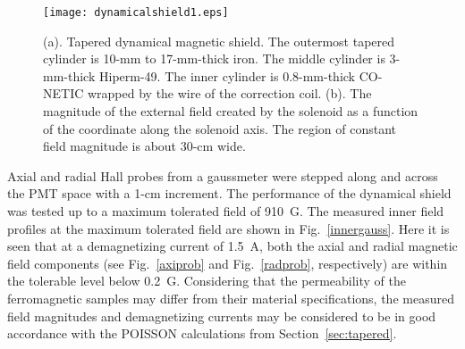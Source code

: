 \documentclass[12pt]{article}
\begin{document}
\begin{figure}[htbp]
\centering
\subfloat[]
{\texttt{[image: dynamicalshield1.eps]}
\label{DMSPHOTO}}
\qquad
{}
\caption{(a). Tapered dynamical magnetic shield. The outermost tapered cylinder is 
10-mm to 17-mm-thick iron. The middle cylinder is 3-mm-thick Hiperm-49. The inner 
cylinder is 0.8-mm-thick CO-NETIC wrapped by the wire of the correction coil. 
(b). The magnitude of the external field created by the solenoid as a function of 
the coordinate along the solenoid axis. The region of constant field magnitude is 
about 30-cm wide.}
\label{Tapered_Shield_photh}
\end{figure}

Axial and radial Hall probes from a gaussmeter were stepped along and across 
the PMT space with a 1-cm increment. The performance of the dynamical shield was 
tested up to a maximum tolerated field of 910~G. The measured inner field 
profiles at the maximum tolerated field are shown in Fig.~\ref{innergauss}.
Here it is seen that at a demagnetizing current of 1.5~A, both the axial and
radial magnetic field components (see Fig.~\ref{axiprob} and Fig.~\ref{radprob},
respectively) are within the tolerable level below 0.2~G. Considering that 
the permeability of the ferromagnetic samples may differ from their material 
specifications, the measured field magnitudes and demagnetizing currents may be 
considered to be in good accordance with the POISSON calculations from 
Section~\ref{sec:tapered}.
\end{document}
